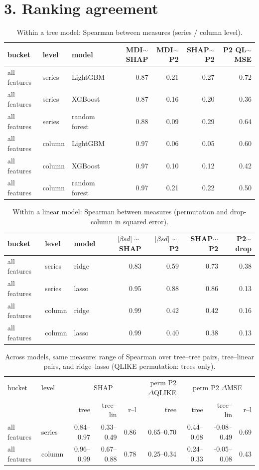 \documentclass[10pt]{article}
\begin{document}
\section*{3. Ranking agreement}
\begin{table}[H]\centering\scriptsize
\caption{Within a tree model: Spearman between measures (series / column level).}
\begin{tabular}{lllrrrr}\toprule
bucket & level & model & MDI$\sim$SHAP & MDI$\sim$P2 & SHAP$\sim$P2 & P2 QL$\sim$MSE\\\midrule
all features & series & LightGBM & 0.87 & 0.21 & 0.27 & 0.72 \\
all features & series & XGBoost & 0.87 & 0.16 & 0.20 & 0.36 \\
all features & series & random forest & 0.88 & 0.09 & 0.29 & 0.64 \\
all features & column & LightGBM & 0.97 & 0.06 & 0.05 & 0.60 \\
all features & column & XGBoost & 0.97 & 0.10 & 0.12 & 0.42 \\
all features & column & random forest & 0.97 & 0.21 & 0.22 & 0.50 \\
\bottomrule\end{tabular}\end{table}
\begin{table}[H]\centering\scriptsize
\caption{Within a linear model: Spearman between measures (permutation and drop-column in squared error).}
\begin{tabular}{lllrrrr}\toprule
bucket & level & model & $|\beta sd|\sim$SHAP & $|\beta sd|\sim$P2 & SHAP$\sim$P2 & P2$\sim$drop\\\midrule
all features & series & ridge & 0.83 & 0.59 & 0.73 & 0.38 \\
all features & series & lasso & 0.95 & 0.88 & 0.86 & 0.13 \\
all features & column & ridge & 0.99 & 0.42 & 0.42 & 0.16 \\
all features & column & lasso & 0.99 & 0.40 & 0.38 & 0.13 \\
\bottomrule\end{tabular}\end{table}
\begin{table}[H]\centering\scriptsize
\caption{Across models, same measure: range of Spearman over tree--tree pairs, tree--linear pairs, and ridge--lasso (QLIKE permutation: trees only).}
\begin{tabular}{llrrrrrrr}\toprule
bucket & level & \multicolumn{3}{c}{SHAP} & perm P2 $\Delta$QLIKE & \multicolumn{3}{c}{perm P2 $\Delta$MSE}\\ & & tree & tree--lin & r--l & tree & tree & tree--lin & r--l\\\midrule
all features & series & 0.84--0.97 & 0.33--0.49 & 0.86 & 0.65--0.70 & 0.44--0.68 & -0.08--0.49 & 0.69 \\
all features & column & 0.96--0.99 & 0.67--0.88 & 0.78 & 0.25--0.34 & 0.24--0.33 & -0.05--0.08 & 0.43 \\
\bottomrule\end{tabular}\end{table}
\end{document}
